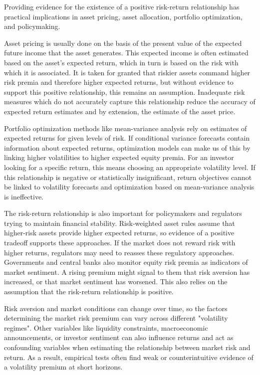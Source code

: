 \documentclass[12pt]{article}
\begin{document}
Providing evidence for the existence of a positive risk-return relationship has practical implications in asset pricing, asset allocation, portfolio optimization, and policymaking.\par
Asset pricing is usually done on the basis of the present value of the expected future income that the asset generates. This expected income is often estimated based on the asset's expected return, which in turn is based on the risk with which it is associated. It is taken for granted that riskier assets command higher risk premia and therefore higher expected returns, but without evidence to support this positive relationship, this remains an assumption. Inadequate risk measures which do not accurately capture this relationship reduce the accuracy of expected return estimates and by extension, the estimate of the asset price.\par
Portfolio optimization methods like mean-variance analysis rely on estimates of expected returns for given levels of risk. If conditional variance forecasts contain information about expected returns, optimization models can make us of this by linking higher volatilities to higher expected equity premia. For an investor looking for a specific return, this means choosing an appropriate volatility level. If this relationship is negative or statistically insignificant, return objectives cannot be linked to volatility forecasts and optimization based on mean-variance analysis is ineffective.\par
The risk-return relationship is also important for policymakers and regulators trying to maintain financial stability. Risk-weighted asset rules assume that higher-risk assets provide higher expected returns, so evidence of a positive tradeoff supports these approaches. If the market does not reward risk with higher returns, regulators may need to reasses these regulatory approaches. Governments and central banks also monitor equity risk premia as indicators of market sentiment. A rising premium might signal to them that risk aversion has increased, or that market sentiment has worsened. This also relies on the assumption that the risk-return relationship is positive.\par
Risk aversion and market conditions can change over time, so the factors determining the market risk premium can vary across different "volatility regimes". Other variables like liquidity constraints, macroeconomic announcements, or investor sentiment can also influence returns and act as confounding variables when estimating the relationship between market risk and return. As a result, empirical tests often find weak or counterintuitive evidence of a volatility premium at short horizons.\par
\end{document}
